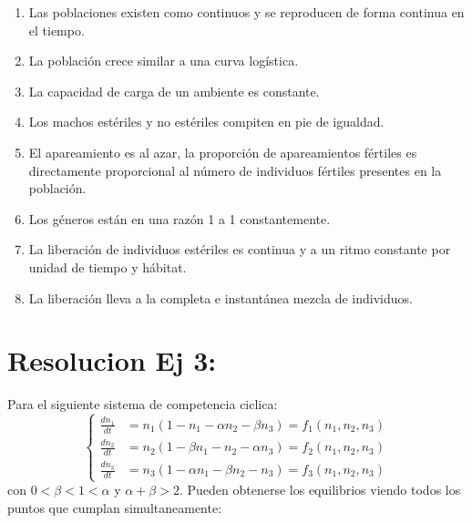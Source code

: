 \documentclass[twocolumn,aps,prl]{revtex4-1}
\begin{document}
\begin{enumerate}[label=\alph*)]
    \item Las poblaciones existen como continuos y se reproducen de forma continua en el tiempo.
    \item La población crece similar a una curva logística.
    \item La capacidad de carga de un ambiente es constante.
    \item Los machos estériles y no estériles compiten en pie de igualdad.
    \item El apareamiento es al azar, la proporción de apareamientos fértiles es directamente proporcional al número de individuos fértiles presentes en la población.
    \item Los géneros están en una razón 1 a 1 constantemente.
    \item La liberación de individuos estériles es continua y a un ritmo constante por unidad de tiempo y hábitat.
    \item La liberación lleva a la completa e instantánea mezcla de individuos.
\end{enumerate}

% 
%                                 
% 

\section{Resolucion Ej 3:}

Para el siguiente sistema de competencia ciclica:
$$
\left\{
\begin{aligned}
\frac{d n_{1}}{d t}&=n_{1}\left(1-n_{1}-\alpha n_{2}-\beta n_{3}\right) = f_1(n_1,n_2,n_3)\\
\frac{d n_{2}}{d t}&=n_{2}\left(1-\beta n_{1}-n_{2}-\alpha n_{3}\right) = f_2(n_1,n_2,n_3) \\
\frac{d n_{3}}{d t}&=n_{3}\left(1-\alpha n_{1}-\beta n_{2}-n_{3}\right) = f_3(n_1,n_2,n_3)
\end{aligned}
\right.
$$
con $0<\beta<1<\alpha$ y $\alpha+\beta>2$. Pueden obtenerse los  equilibrios viendo todos los puntos que cumplan simultaneamente: 
\end{document}
